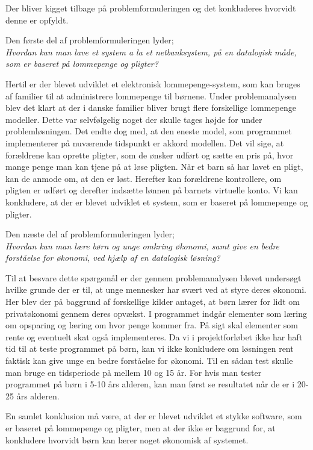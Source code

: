 Der bliver kigget tilbage på problemformuleringen og det konkluderes hvorvidt denne er opfyldt.  

Den første del af problemformuleringen lyder;\\
\textit{Hvordan kan man lave et system a la et netbanksystem, på en datalogisk måde, som er baseret på lommepenge og pligter?}

Hertil er der blevet udviklet et elektronisk lommepenge-system, som kan bruges af familier til at administrere lommepenge til børnene. Under problemanalysen blev det klart at der i danske familier bliver brugt flere forskellige lommepenge modeller. Dette var selvfølgelig noget der skulle tages højde for under problemløsningen. Det endte dog med, at den eneste model, som programmet implementerer på nuværende tidspunkt er akkord modellen. Det vil sige, at forældrene kan oprette pligter, som de ønsker udført og sætte en pris på, hvor mange penge man kan tjene på at løse pligten. Når et barn så har lavet en pligt, kan de anmode om, at den er løst. Herefter kan forældrene kontrollere, om pligten er udført og derefter indsætte lønnen på barnets virtuelle konto. Vi kan konkludere, at der er blevet udviklet et system, som er baseret på lommepenge og pligter.

Den næste del af problemformuleringen lyder;\\
\textit{Hvordan kan man lære børn og unge omkring økonomi, samt give en bedre forståelse for økonomi, ved hjælp af en datalogisk løsning?}

Til at besvare dette spørgsmål er der gennem problemanalysen blevet undersøgt hvilke grunde der er til, at unge mennesker har svært ved at styre deres økonomi. Her blev der på baggrund af forskellige kilder antaget, at børn lærer for lidt om privatøkonomi gennem deres opvækst. 
I programmet indgår elementer som læring om opsparing og læring om hvor penge kommer fra. På sigt skal elementer som rente og eventuelt skat også implementeres. Da vi i projektforløbet ikke har haft tid til at teste programmet på børn, kan vi ikke konkludere om løsningen rent faktisk kan give unge en bedre forståelse for økonomi. Til en sådan test skulle man bruge en tidsperiode på mellem 10 og 15 år. For hvis man tester programmet på børn i 5-10 års alderen, kan man først se resultatet når de er i 20-25 års alderen.

En samlet konklusion må være, at der er blevet udviklet et stykke software, som er baseret på lommepenge og pligter, men at der ikke er baggrund for, at konkludere hvorvidt børn kan lærer noget økonomisk af systemet.
